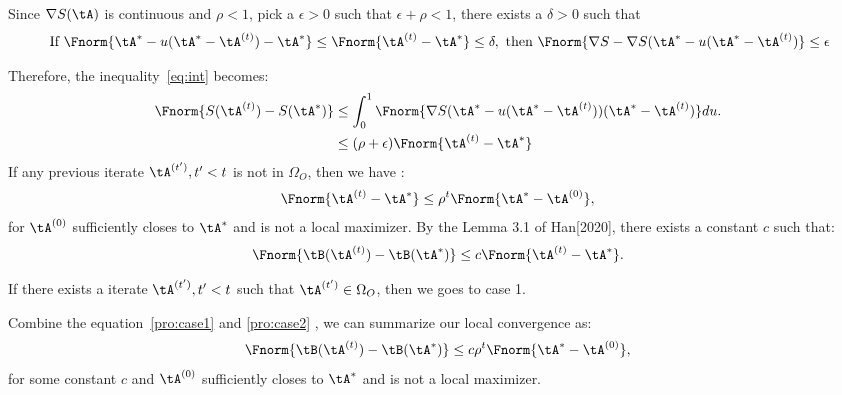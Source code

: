 \documentclass[11pt]{article}
\begin{document}
Since $\nabla S(\tA)$ is continuous and $\rho < 1$, pick a $\epsilon > 0$ such that $\epsilon + \rho < 1$, there exists a $\delta >0$ such that 
\begin{align*}
	\text{ If } \Fnorm{\tA^{*} - u (\tA^* - \tA^{(t)}) - \tA^*} \leq \Fnorm{\tA^{(t)} - \tA^*} \leq \delta, \text{ then } \Fnorm{ \nabla S - \nabla S( \tA^{*} - u (\tA^* - \tA^{(t)})} \leq \epsilon
\end{align*}

Therefore, the inequality~\ref{eq:int} becomes:
\begin{align*}
	\Fnorm{S(\tA^{(t)})- S(\tA^*)} &\leq \int_{0}^1 \Fnorm{\nabla S( \tA^{*} - u (\tA^* - \tA^{(t)})) (\tA^* - \tA^{(t)})} du.\\
	&\leq (\rho + \epsilon )\Fnorm{\tA^{(t)} - \tA^* }
\end{align*}
If any previous iterate $\tA^{(t')}, t'< t$ is not in $\Omega_O$, then we have :
\begin{align*}
	\Fnorm{\tA^{(t)}- \tA^*} \leq \rho^t \Fnorm{\tA^* - \tA^{(0)}},
\end{align*}
for $\tA^{(0)}$ sufficiently closes to $\tA^*$ and is not a local maximizer.
By the Lemma 3.1 of Han[2020], there exists a constant $c$ such that:
\begin{align}\label{pro:case2}
	\Fnorm{\tB(\tA^{(t)}) - \tB(\tA^*)} \leq c\Fnorm{\tA^{(t)}- \tA^*} .
\end{align} 


If there exists a iterate $\tA^{(t')}, t'< t$ such that $\tA^{(t')} \in \Omega_O$, then we goes to case 1.

Combine the equation~\ref{pro:case1} and \ref{pro:case2} , we can summarize our local convergence as:
\begin{align*}
	\Fnorm{\tB(\tA^{(t)}) - \tB(\tA^*)} \leq c \rho^t \Fnorm{\tA^* - \tA^{(0)}},
\end{align*}
for some constant $c$ and $\tA^{(0)}$ sufficiently closes to $\tA^*$ and is not a local maximizer.

	
\end{document}
